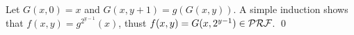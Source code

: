 
\begin{pf} \rm
 Let $G(x, 0) = x$ and $G(x, y + 1) = g(G(x, y))$.
 A simple induction shows that $f(x, y) = g^{2^{y-1}}(x)$,
 thust $f(x,y) = G(x, 2^{y-1}) \in\mathcal{PRF}$. \qed
\end{pf}



